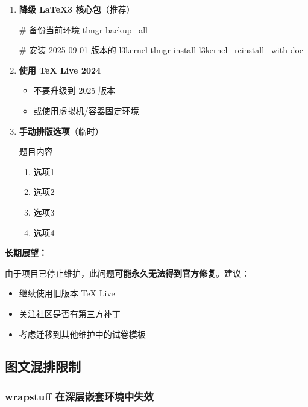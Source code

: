 \begin{enumerate}
  \item \textbf{降级 \LaTeX3 核心包}（推荐）
    \begin{shellcode}[morekeywords={tlmgr}]
  # 备份当前环境
  tlmgr backup --all

  # 安装 2025-09-01 版本的 l3kernel
  tlmgr install l3kernel --reinstall --with-doc
    \end{shellcode}

  \item \textbf{使用 \TeX{} Live 2024}
    \begin{itemize}
      \item 不要升级到 2025 版本
      \item 或使用虚拟机/容器固定环境
    \end{itemize}

  \item \textbf{手动排版选项}（临时）
    \begin{latexcode}
  \begin{question}
    题目内容 \paren[B]

    \begin{enumerate}[label=\Alph*., itemsep=0.5em]
      \item 选项1
      \item 选项2
      \item 选项3
      \item 选项4
    \end{enumerate}
  \end{question}
    \end{latexcode}
\end{enumerate}

\textbf{长期展望：}

由于项目已停止维护，此问题\textbf{可能永久无法得到官方修复}。建议：

\begin{itemize}
  \item 继续使用旧版本 \TeX{} Live
  \item 关注社区是否有第三方补丁
  \item 考虑迁移到其他维护中的试卷模板
\end{itemize}


\subsection{图文混排限制}

\subsubsection{wrapstuff 在深层嵌套环境中失效}

